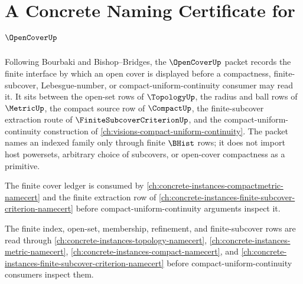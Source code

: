 \chapter{A Concrete Naming Certificate for $\OpenCoverUp$}
\label{ch:concrete-instances-open-cover-namecert}

Following Bourbaki and Bishop--Bridges, the $\OpenCoverUp$ packet records the finite interface by which an open cover is displayed before a compactness, finite-subcover, Lebesgue-number, or compact-uniform-continuity consumer may read it. It sits between the open-set rows of $\TopologyUp$, the radius and ball rows of $\MetricUp$, the compact source row of $\CompactUp$, the finite-subcover extraction route of $\FiniteSubcoverCriterionUp$, and the compact-uniform-continuity construction of \autoref{ch:visions-compact-uniform-continuity}. The packet names an indexed family only through finite $\BHist$ rows; it does not import host powersets, arbitrary choice of subcovers, or open-cover compactness as a primitive.

The finite cover ledger is consumed by \autoref{ch:concrete-instances-compactmetric-namecert} and the finite extraction row of \autoref{ch:concrete-instances-finite-subcover-criterion-namecert} before compact-uniform-continuity arguments inspect it.

The finite index, open-set, membership, refinement, and finite-subcover rows are read through \autoref{ch:concrete-instances-topology-namecert}, \autoref{ch:concrete-instances-metric-namecert}, \autoref{ch:concrete-instances-compact-namecert}, and \autoref{ch:concrete-instances-finite-subcover-criterion-namecert} before compact-uniform-continuity consumers inspect them.

